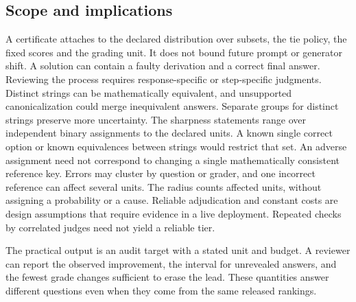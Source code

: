 \documentclass[10pt,letterpaper]{article}
\begin{document}
\subsection*{Scope and implications}
A certificate attaches to the declared distribution over subsets, the tie policy, the fixed scores and the grading unit. It does not bound future prompt or generator shift. A solution can contain a faulty derivation and a correct final answer. Reviewing the process requires response-specific or step-specific judgments. Distinct strings can be mathematically equivalent, and unsupported canonicalization could merge inequivalent answers. Separate groups for distinct strings preserve more uncertainty. The sharpness statements range over independent binary assignments to the declared units. A known single correct option or known equivalences between strings would restrict that set. An adverse assignment need not correspond to changing a single mathematically consistent reference key. Errors may cluster by question or grader, and one incorrect reference can affect several units. The radius counts affected units, without assigning a probability or a cause. Reliable adjudication and constant costs are design assumptions that require evidence in a live deployment. Repeated checks by correlated judges need not yield a reliable tier.

The practical output is an audit target with a stated unit and budget. A reviewer can report the observed improvement, the interval for unrevealed answers, and the fewest grade changes sufficient to erase the lead. These quantities answer different questions even when they come from the same released rankings.
\end{document}
